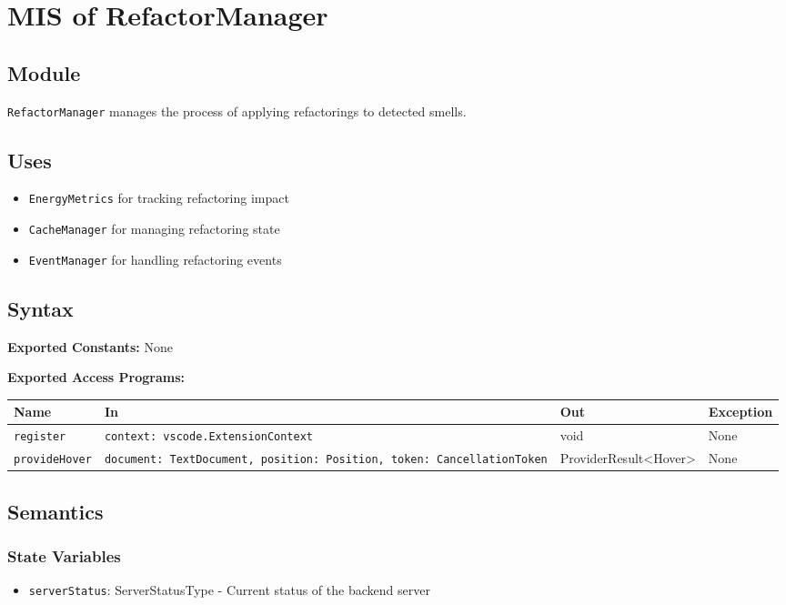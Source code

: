 \documentclass[12pt, titlepage]{article}
\begin{document}
\section{MIS of RefactorManager}

\subsection{Module}
\texttt{RefactorManager} manages the process of applying refactorings to detected smells.

\subsection{Uses}
\begin{itemize}
\item \texttt{EnergyMetrics} for tracking refactoring impact
\item \texttt{CacheManager} for managing refactoring state
\item \texttt{EventManager} for handling refactoring events
\end{itemize}

\subsection{Syntax}

\textbf{Exported Constants:} None

\textbf{Exported Access Programs:}\\

\begin{tabularx}{\linewidth}{|l|>{\raggedright\arraybackslash}X|l|l|}
  \hline
  \textbf{Name} & \textbf{In} & \textbf{Out} & \textbf{Exception} \\
  \hline
  \texttt{register} & \texttt{context: vscode.ExtensionContext} & void & None \\ \hline
  \texttt{provideHover} & \texttt{document: TextDocument, position: Position, token: CancellationToken} & ProviderResult<Hover> & None \\
  \hline
\end{tabularx}

\subsection{Semantics}

\subsubsection{State Variables}
\begin{itemize}
\item \texttt{serverStatus}: ServerStatusType - Current status of the backend server
\end{itemize}
\end{document}
